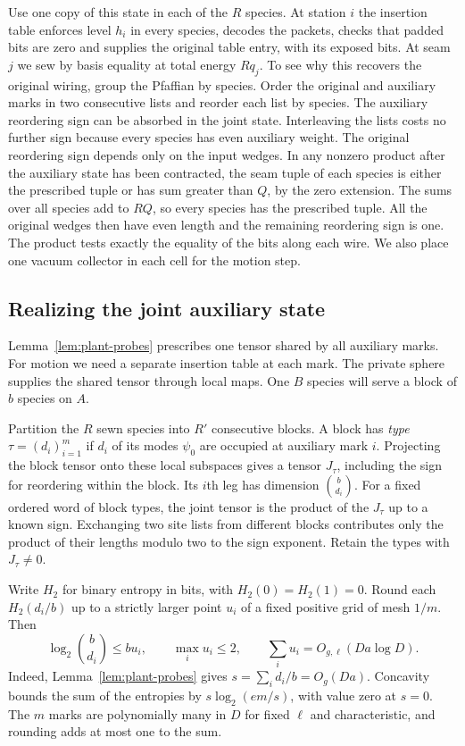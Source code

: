 Use one copy of this state in each of the $R$ species. At station $i$
the insertion table enforces level $h_i$ in every species, decodes the
packets, checks that padded bits are zero and supplies the original
table entry, with its exposed bits. At seam $j$ we sew by basis
equality at total energy $Rq_j$. To see why this recovers the original
wiring, group the Pfaffian by species. Order the original and auxiliary
marks in two consecutive lists and reorder each list by species.
The auxiliary reordering sign can be absorbed in the joint state.
Interleaving the lists costs no further sign because every species
has even auxiliary weight. The original reordering sign depends only on
the input wedges. In any nonzero product after the auxiliary state has
been contracted, the seam tuple of each species
is either the prescribed tuple or has sum greater than $Q$, by the zero
extension. The sums over all species add to $RQ$, so every species
has the prescribed tuple. All the original wedges then have even
length and the remaining reordering sign is one. The product tests
exactly the equality of the bits along each wire. We also place one
vacuum collector in each cell for the motion step.

\subsection{Realizing the joint auxiliary state}\label{subsec:plant-private}

Lemma~\ref{lem:plant-probes} prescribes one tensor shared by all
auxiliary marks. For motion we need a separate insertion table at
each mark. The private sphere supplies the shared tensor through
local maps. One $B$ species will serve a block of $b$ species on $A$.

Partition the $R$ sewn species into $R'$ consecutive blocks. A block
has \emph{type} $\tau=(d_i)_{i=1}^m$ if $d_i$ of its modes $\psi_0$
are occupied at auxiliary mark $i$. Projecting the block tensor onto
these local subspaces gives a tensor $J_\tau$, including the sign
for reordering within the block. Its $i$th leg has dimension
$\binom b{d_i}$. For a fixed ordered word of block types, the joint
tensor is the product of the $J_\tau$ up to a known sign. Exchanging
two site lists from different blocks contributes only the product of
their lengths modulo two to the sign exponent. Retain the types with
$J_\tau\ne0$.

Write $H_2$ for binary entropy in bits, with $H_2(0)=H_2(1)=0$.
Round each $H_2(d_i/b)$ up to a strictly larger point $u_i$ of a
fixed positive grid of mesh $1/m$. Then
\begin{equation}\label{eq:plant-ent}
 \log_2\binom b{d_i}\le b u_i,\qquad
 \max_i u_i\le 2,\qquad \sum_i u_i=O_{g,\ell}(Da\log D).
\end{equation}
Indeed, Lemma~\ref{lem:plant-probes} gives $s=\sum_i d_i/b=O_g(Da)$.
Concavity bounds the sum of the entropies by $s\log_2(em/s)$,
with value zero at $s=0$. The $m$ marks are polynomially many in $D$
for fixed $\ell$ and characteristic, and rounding adds at most one
to the sum.

